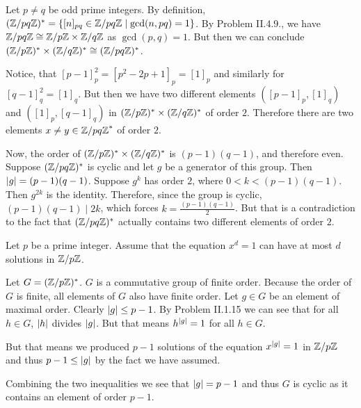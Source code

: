 \begin{problem}
\end{problem}

\begin{solution}
	Let $p \neq q$ be odd prime integers. By definition, $(\mathbb{Z}/pq\mathbb{Z})^* = \{[n]_{pq} \in \mathbb{Z}/pq\mathbb{Z} \mid \gcd(n, pq) = 1\}$. By Problem II.4.9., we have $\mathbb{Z}/pq\mathbb{Z} \cong \mathbb{Z}/p\mathbb{Z} \times \mathbb{Z}/q\mathbb{Z}$ as $\gcd(p, q) = 1$. But then we can conclude $(\mathbb{Z}/p\mathbb{Z})^* \times (\mathbb{Z}/q\mathbb{Z})^* \cong (\mathbb{Z}/pq\mathbb{Z})^*$.
	
	Notice, that $[p-1]^2_p = [p^2 - 2p + 1]_p = [1]_p$ and similarly for $[q-1]^2_q = [1]_q$. But then we have two different elements $([p-1]_p, [1]_q)$ and $([1]_p, [q-1]_q)$ in $(\mathbb{Z}/p\mathbb{Z})^* \times (\mathbb{Z}/q\mathbb{Z})^*$ of order $2$. Therefore there are two elements $x \neq y \in {\mathbb{Z}/pq\mathbb{Z}}^*$ of order $2$.
	
	Now, the order of $(\mathbb{Z}/p\mathbb{Z})^* \times (\mathbb{Z}/q\mathbb{Z})^*$ is $(p-1)(q-1)$, and therefore even. Suppose $(\mathbb{Z}/pq\mathbb{Z})^*$ is cyclic and let $g$ be a generator of this group. Then $\left|g\right| = (p-1)(q-1)$. Suppose $g^k$ has order $2$, where $0 < k < (p-1)(q-1)$. Then $g^{2k}$ is the identity. Therefore, since the group is cyclic, $(p-1)(q-1) \mid 2k$, which forces $k = \frac{(p-1)(q-1)}{2}$. But that is a contradiction to the fact that $(\mathbb{Z}/pq\mathbb{Z})^*$ actually contains two different elements of order $2$.
\end{solution}

\begin{problem}
\end{problem}

\begin{solution}
	Let $p$ be a prime integer. Assume that the equation $x^d = 1$ can have at most $d$ solutions in $\mathbb{Z}/p\mathbb{Z}$.
	
	Let $G = (\mathbb{Z}/p\mathbb{Z})^*$. $G$ is a commutative group of finite order. Because the order of $G$ is finite, all elements of $G$ also have finite order. Let $g \in G$ be an element of maximal order. Clearly $\left|g\right| \leq p-1$. By Problem II.1.15 we can see that for all $h \in G$, $\left|h\right|$ divides $\left|g\right|$. But that means $h^{\left|g\right|} = 1$ for all $h \in G$.
	
	But that means we produced $p-1$ solutions of the equation $x^{\left|g\right|} = 1$ in $\mathbb{Z}/p\mathbb{Z}$ and thus $p-1 \leq \left|g\right|$ by the fact we have assumed.
	
	Combining the two inequalities we see that $\left|g\right| = p-1$ and thus $G$ is cyclic as it contains an element of order $p-1$.
\end{solution}

